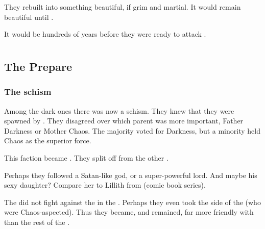 They rebuilt \Nyx into something beautiful, if grim and martial. 
It would remain beautiful until . 

It would be hundreds of years before they were ready to attack \Tembrae. 























\chapter{\SecondbanewarBook}















\section{The \Resphain Prepare}
\subsection{The \Baelzerach schism}
Among the dark ones there was now a schism. They knew that they were spawned by . They disagreed over which parent was more important, Father Darkness or Mother Chaos. The majority voted for Darkness, but a minority held Chaos as the superior force. 

This faction became \Baelzerach. They split off from the other \resphain. 

Perhaps they followed a Satan-like god, or a super-powerful \resphan{} lord. And maybe his sexy daughter? Compare her to Lillith from  (comic book series). 

The \Baelzerach{} did not fight against the \dragons{} in the \secondbanewar{}. Perhaps they even took the side of the \dragons{} (who were Chaos-aspected). Thus they became, and remained, far more friendly with \dragons{} than the rest of the \resphain. 

